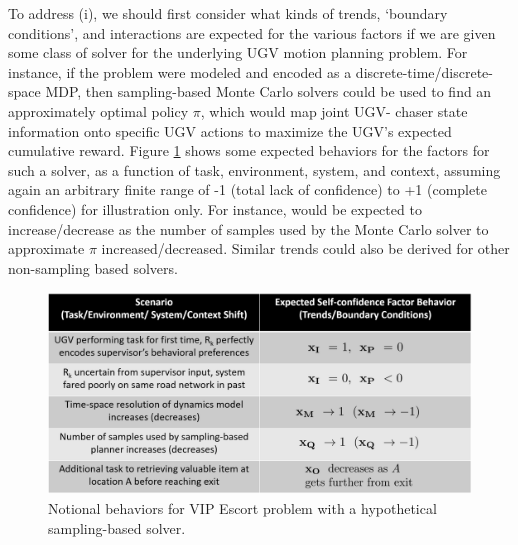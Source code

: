 To address (i), we should first consider what kinds of trends, `boundary conditions', and interactions are expected for the various factors if we are given some class of solver for the underlying UGV motion planning problem. For instance, if the problem were modeled and encoded as a discrete-time/discrete-space MDP, then sampling-based Monte Carlo solvers could be used to find an approximately optimal policy $\pi$, which would map joint UGV- chaser state information onto specific UGV actions to maximize the UGV's expected cumulative reward. Figure \ref{fig:trendsBCs} shows some expected behaviors for the \famsec{} factors for such a solver, as a function of task, environment, system, and context, assuming again an arbitrary finite range of -1 (total lack of confidence) to +1 (complete confidence) for illustration only. For instance, \xQ{} would be expected to increase/decrease as the number of samples used by the Monte Carlo solver to approximate $\pi$ increased/decreased. Similar trends could also be derived for other non-sampling based solvers.  %
\begin{figure}[tbp]
    \centering
    \includegraphics[width=0.99\linewidth]{Figures/scTrendsBoundaryExample.png}
    \caption{Notional \famsec{} behaviors for VIP Escort problem with a hypothetical sampling-based solver.}
    \label{fig:trendsBCs}
    \vspace{-0.5cm}
\end{figure}

